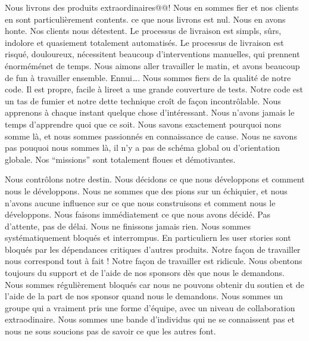 \cropmarktop%
%
  {Nous livrons des produits extraordinaires@@! Nous en sommes fier et nos clients en sont particulièrement contents.}
  {ce que nous livrons est nul. Nous en avons honte. Nos clients nous détestent.}
%
  {Le processus de livraison est simpls, sûrs, indolore et quasiement totalement automatisés.}
  {Le processus de livraison est risqué, douloureux, nécessitent beaucoup d'interventions manuelles, qui prennent énorméménet de temps.}
%
  {Nous aimons aller travailler le matin, et avons beaucoup de fun à travailler ensemble.}
  {Ennui\ldots{}.}
%
\cropmarkmiddle%
%
  {Nous sommes fiers de la qualité de notre code. Il est propre, facile à lireet a une grande couverture de tests.}
  {Notre code est un tas de fumier et notre dette technique croît de façon incontrôlable.}
  {Nous apprenons à chaque instant quelque chose d'intéressant.}
  {Nous n'avons jamais le temps d'apprendre quoi que ce soit.}
  {Nous savons exactement pourquoi nons somme là, et nous sommes passionnés en connaissance de cause.}
  {Nous ne savons pas pouquoi nous sommes là, il n'y a pas de schéma global ou d'orientation globale. Nos ``missions'' sont totalement floues et démotivantes.}
%
\cropmarkbottom

\clearpage
\cropmarktop%
%
 {Nous contrôlons notre destin. Nous décidons ce que nous développons et comment nous le développons.}
 {Nous ne sommes que des pions sur un échiquier, et nous n'avons aucune influence sur ce que nous construisons et comment nous le développons.}
  {Nous faisons immédiatement ce que nous avons décidé. Pas d'attente, pas de délai.}
  {Nous ne finissons jamais rien. Nous sommes systématiquement bloqués et interrompus. En particuliern les user stories sont bloqués par les dépendances critiques d'autres produits.}
  {Notre façon de travailler nous correspond tout à fait !}
  {Notre façon de travailler est ridicule.}
%
\cropmarkmiddle%
%
  {Nous obentons toujours du support et de l'aide de nos sponsors dès que nous le demandons.}
  {Nous sommes régulièrement bloqués car nous ne pouvons obtenir du soutien et de l'aide de la part de nos sponsor quand nous le demandons.}
%
  {Nous sommes un groupe qui a vraiment pris une forme d'équipe, avec un niveau de collaboration extraodinaire.}
  {Nous sommes une bande d'individus qui ne se connaissent pas et nous ne sous soucions pas de savoir ce que les autres font.}
%
\cropmarkbottom

